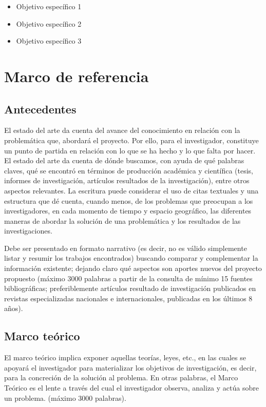\documentclass[12pt,letterpaper]{report}
\begin{document}
\begin{itemize}
    \setlength\itemsep{6pt}
    \item Objetivo específico 1
    \item Objetivo específico 2
    \item Objetivo específico 3
\end{itemize}

\chapter{Marco de referencia}

\section{Antecedentes}

El estado del arte da cuenta del avance del conocimiento en relación con la problemática que, abordará el proyecto. Por ello, para el investigador, constituye un punto de partida en relación con lo que se ha hecho y lo que falta por hacer. El estado del arte da cuenta de dónde buscamos, con ayuda de qué palabras claves, qué se encontró en términos de producción académica y científica (tesis, informes de investigación, artículos resultados de la investigación), entre otros aspectos relevantes. La escritura puede considerar el uso de citas textuales y una estructura que dé cuenta, cuando menos, de los problemas que preocupan a los investigadores, en cada momento de tiempo y espacio geográfico, las diferentes maneras de abordar la solución de una problemática y los resultados de las investigaciones.

Debe ser presentado en formato narrativo (es decir, no es válido simplemente listar y resumir los trabajos encontrados) buscando comparar y complementar la información existente; dejando claro qué aspectos son aportes nuevos del proyecto propuesto (máximo 3000 palabras a partir de la consulta de mínimo 15 fuentes bibliográficas; preferiblemente artículos resultado de investigación publicados en revistas especializadas nacionales e internacionales, publicadas en los últimos 8 años).

\section{Marco teórico}

El marco teórico implica exponer aquellas teorías, leyes, etc., en las cuales se apoyará el investigador para materializar los objetivos de investigación, es decir, para la concreción de la solución al problema. En otras palabras, el Marco Teórico es el lente a través del cual el investigador observa, analiza y actúa sobre un problema. (máximo 3000 palabras).
\end{document}
